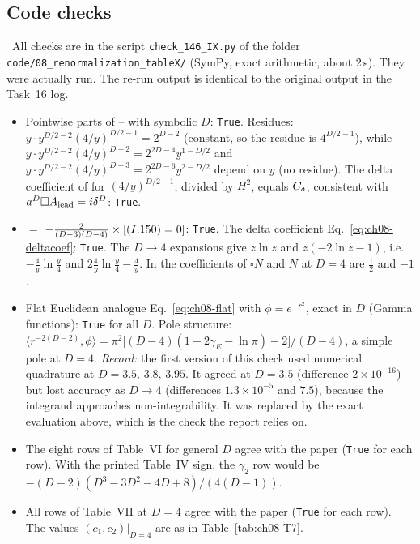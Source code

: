 \subsection{Code checks}
\label{sec:ch08-t16-code}
\tC\ All checks are in the script \texttt{check\_146\_IX.py} of the folder \texttt{code/08\_renormalization\_tableX/} (SymPy, exact arithmetic, about 2\,s). They were actually run.
The re-run output is identical to the original output in the Task~16 log.
\begin{itemize}[leftmargin=*,itemsep=3pt]
\item[(A)] Pointwise parts of -- with symbolic $D$: \texttt{True}.
Residues: $y\cdot y^{D/2-2}(4/y)^{D/2-1}=2^{D-2}$ (constant, so the residue is $4^{D/2-1}$), while $y\cdot y^{D/2-2}(4/y)^{D-2}=2^{2D-4}y^{1-D/2}$ and $y\cdot y^{D/2-2}(4/y)^{D-3}=2^{2D-6}y^{2-D/2}$ depend on $y$ (no residue).
The delta coefficient of  for $(4/y)^{D/2-1}$, divided by $H^2$, equals $C_{\delta}$, consistent with $a^D\square A_{\rm lead}=i\delta^D$: \texttt{True}.
\item[(B)]  $=$  $-\frac{2}{(D-3)(D-4)}\times[(I.150)=0]$: \texttt{True}. The delta coefficient Eq.~\eqref{eq:ch08-deltacoef}: \texttt{True}.
The $D\to4$ expansions give $z\ln z$ and $z(-2\ln z-1)$, i.e.\ $-\frac4y\ln\frac y4$ and $2\frac4y\ln\frac y4-\frac4y$.
In  the coefficients of $\square N$ and $N$ at $D=4$ are $\tfrac12$ and $-1$.
\item[(C)] Flat Euclidean analogue Eq.~\eqref{eq:ch08-flat} with $\phi=e^{-r^2}$, exact in $D$ (Gamma functions): \texttt{True} for all $D$.
Pole structure: $\langle r^{-2(D-2)},\phi\rangle=\pi^2\big[(D-4)(1-2\gamma_E-\ln\pi)-2\big]/(D-4)$, a simple pole at $D=4$.
\emph{Record:} the first version of this check used numerical quadrature at $D=3.5,\,3.8,\,3.95$. It agreed at $D=3.5$ (difference $2\times10^{-16}$) but lost accuracy as $D\to4$ (differences $1.3\times10^{-5}$ and $7.5$), because the integrand approaches non-integrability.
It was replaced by the exact evaluation above, which is the check the report relies on.
\item[(D)] The eight rows of Table~VI for general $D$ agree with the paper (\texttt{True} for each row).
With the printed Table~IV sign, the $\gamma_2$ row would be $-(D-2)(D^3-3D^2-4D+8)/(4(D-1))$.
\item[(E)] All rows of Table~VII at $D=4$ agree with the paper (\texttt{True} for each row). The values $(c_1,c_2)|_{D=4}$ are as in Table~\ref{tab:ch08-T7}.

\end{itemize}
